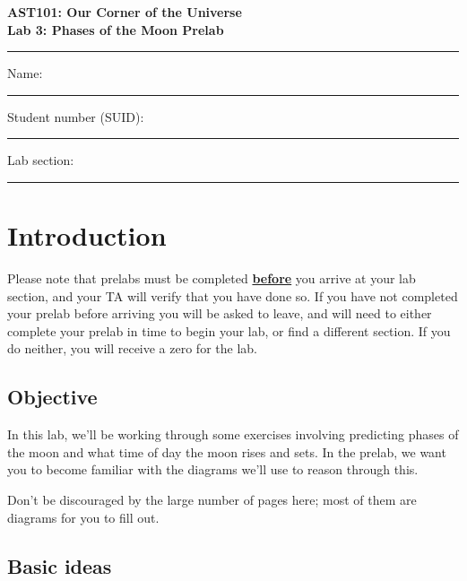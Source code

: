 \documentclass[11pt]{article}
\begin{document}
\begin{center}
\textbf{\Large
AST101: Our Corner of the Universe \\
\vspace*{0.1cm}
Lab 3: Phases of the Moon Prelab
}
\end{center}

\vspace*{0.5cm}

\hrule
{\Large Name:}\vspace*{0.5cm}\\\hrule
{\Large Student number (SUID):}\vspace*{0.5cm}\\\hrule
{\Large Lab section:}\vspace*{0.5cm}\\\hrule
\vspace*{0.5cm}

\section{Introduction}

Please note that prelabs must be completed \underline{\textbf{before}} you arrive at your lab section, and your TA will verify that you have done so. If you have not completed your prelab before arriving you will be asked to leave, and will need to either complete your prelab in time to begin your lab, or find a different section. If you do neither, you will receive a zero for the lab.

\subsection*{Objective}

In this lab, we'll be working through some exercises involving predicting phases of the moon and what time of day the moon 
rises and sets. In the prelab, we want you to become familiar with the diagrams we'll use to reason through this.

Don't be discouraged by the large number of pages here; most of them are diagrams for you to fill out.

\subsection*{Basic ideas}
\end{document}
